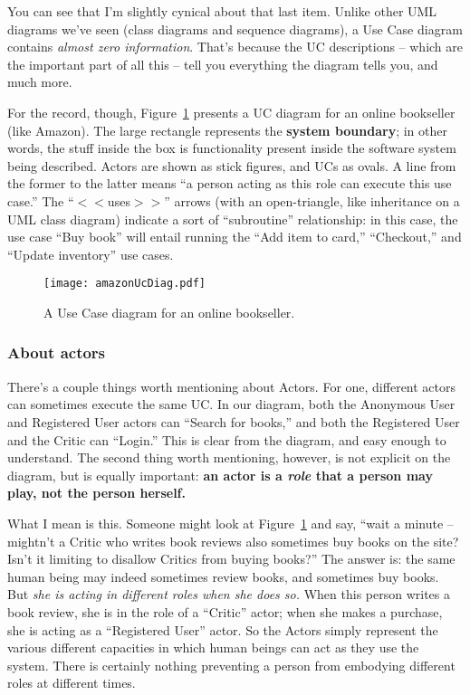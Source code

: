 You can see that I'm slightly cynical about that last item. Unlike other UML
diagrams we've seen (class diagrams and sequence diagrams), a Use Case diagram
contains \textit{almost zero information}. That's because the UC descriptions
-- which are the important part of all this -- tell you everything the diagram
tells you, and much more.

For the record, though, Figure~\ref{fig:amazonUcDiag} presents a UC diagram
for an online bookseller (like Amazon). The large rectangle represents the
\textbf{system boundary}; in other words, the stuff inside the box is
functionality present inside the software system being described. Actors are
shown as stick figures, and UCs as ovals. A line from the former to the latter
means ``a person acting as this role can execute this use case.'' The
``$<<$uses$>>$'' arrows (with an open-triangle, like inheritance on a UML class
diagram) indicate a sort of ``subroutine'' relationship: in this case, the use
case ``Buy book'' will entail running the ``Add item to card,'' ``Checkout,''
and ``Update inventory'' use cases.

\begin{figure}
\centering
\texttt{[image: amazonUcDiag.pdf]}
\caption{A Use Case diagram for an online bookseller.}
\label{fig:amazonUcDiag}
\end{figure}

\subsubsection{About actors}

There's a couple things worth mentioning about Actors. For one, different
actors can sometimes execute the same UC. In our diagram, both the Anonymous
User and Registered User actors can ``Search for books,'' and both the
Registered User and the Critic can ``Login.'' This is clear from the diagram,
and easy enough to understand. The second thing worth mentioning, however, is
not explicit on the diagram, but is equally important: \textbf{an actor is a
\textit{role} that a person may play, not the person herself.}

What I mean is this. Someone might look at Figure~\ref{fig:amazonUcDiag} and
say, ``wait a minute -- mightn't a Critic who writes book reviews also
sometimes buy books on the site? Isn't it limiting to disallow Critics from
buying books?'' The answer is: the same human being may indeed sometimes
review books, and sometimes buy books. But \textit{she is acting in different
roles when she does so.} When this person writes a book review, she is in the
role of a ``Critic'' actor; when she makes a purchase, she is acting as a
``Registered User'' actor. So the Actors simply represent the various
different capacities in which human beings can act as they use the system.
There is certainly nothing preventing a person from embodying different roles
at different times.

